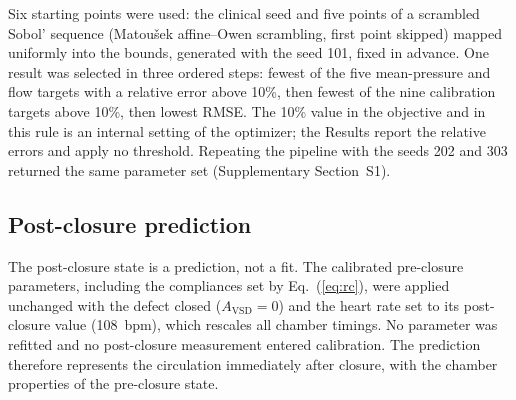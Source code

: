 \documentclass{article}
\begin{document}
\begin{table}[!htbp]
\centering\small
\setlength{\tabcolsep}{3pt}
\caption{Calibration stages for each starting point.}
\label{tab:stages}
\end{table}

Six starting points were used: the clinical seed and five points of a scrambled Sobol' sequence (Matou\v{s}ek affine--Owen scrambling, first point skipped) mapped uniformly into the bounds, generated with the seed 101, fixed in advance. One result was selected in three ordered steps: fewest of the five mean-pressure and flow targets with a relative error above 10\%, then fewest of the nine calibration targets above 10\%, then lowest RMSE. The 10\% value in the objective and in this rule is an internal setting of the optimizer; the Results report the relative errors and apply no threshold. Repeating the pipeline with the seeds 202 and 303 returned the same parameter set (Supplementary Section~S1).

\FloatBarrier
\subsection{Post-closure prediction}
\label{sec:post_methods}
The post-closure state is a prediction, not a fit. The calibrated pre-closure parameters, including the compliances set by Eq.~(\ref{eq:rc}), were applied unchanged with the defect closed ($A_{\mathrm{VSD}} = 0$) and the heart rate set to its post-closure value (108~bpm), which rescales all chamber timings. No parameter was refitted and no post-closure measurement entered calibration. The prediction therefore represents the circulation immediately after closure, with the chamber properties of the pre-closure state.
\end{document}
